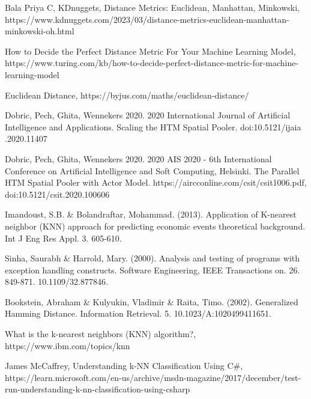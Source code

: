 \documentclass[conference]{IEEEtran}
\begin{document}
\begin{thebibliography}{1}
Bala Priya C, KDnuggets, Distance Metrics: Euclidean, Manhattan, Minkowski, https://www.kdnuggets.com/2023/03/distance-metrics-euclidean-manhattan-minkowski-oh.html


How to Decide the Perfect Distance Metric For Your Machine Learning Model, https://www.turing.com/kb/how-to-decide-perfect-distance-metric-for-machine-learning-model

Euclidean Distance, https://byjus.com/maths/euclidean-distance/

Dobric, Pech, Ghita, Wennekers 2020. 2020 International Journal of Artificial Intelligence and Applications. Scaling the HTM Spatial Pooler. doi:10.5121/ijaia .2020.11407

Dobric, Pech, Ghita, Wennekers 2020. 2020 AIS 2020 - 6th International Conference on Artificial Intelligence and Soft Computing, Helsinki. The Parallel HTM Spatial Pooler with Actor Model. https://aircconline.com/csit/csit1006.pdf, doi:10.5121/csit.2020.100606

Imandoust, S.B. \& Bolandraftar, Mohammad. (2013). Application of K-nearest neighbor (KNN) approach for predicting economic events theoretical background. Int J Eng Res Appl. 3. 605-610. 

Sinha, Saurabh \& Harrold, Mary. (2000). Analysis and testing of programs with exception handling constructs. Software Engineering, IEEE Transactions on. 26. 849-871. 10.1109/32.877846. 

Bookstein, Abraham \& Kulyukin, Vladimir \& Raita, Timo. (2002). Generalized Hamming Distance. Information Retrieval. 5. 10.1023/A:1020499411651. 

What is the k-nearest neighbors (KNN) algorithm?, https://www.ibm.com/topics/knn

James McCaffrey, Understanding k-NN Classification Using C\#, https://learn.microsoft.com/en-us/archive/msdn-magazine/2017/december/test-run-understanding-k-nn-classification-using-csharp


\end{thebibliography}




\end{document}
